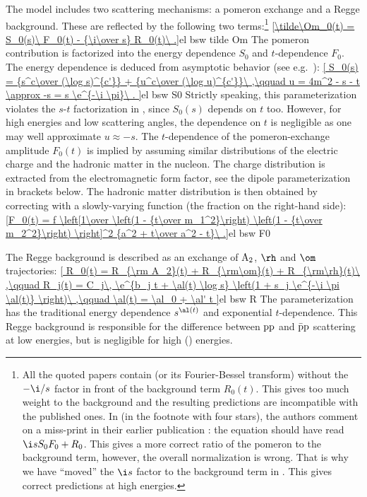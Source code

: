 The model includes two scattering mechanisms: a pomeron exchange and a Regge background. These are reflected by the following two terms:\footnote{%
All the quoted papers contain  (or its Fourier-Bessel transform) without the $-\i/s$ factor in front of the background term $R_0(t)$. This gives too much weight to the background and the resulting predictions are incompatible with the published ones. In  (in the footnote with four stars), the authors comment on a miss-print in their earlier publication : the equation should have read $\i s S_0 F_0 + R_0$. This gives a more correct ratio of the pomeron to the background term, however, the overall normalization is wrong. That is why we have ``moved'' the $\i s$ factor to the background term in . This gives correct predictions at high energies.
}
\eqref{\tilde\Om_0(t) = S_0(s)\ F_0(t) - {\i\over s} R_0(t)\ .}{el bsw tilde Om}
The pomeron contribution is factorized into the energy dependence $S_0$ and $t$-dependence $F_0$. The energy dependence is deduced from asymptotic  behavior (see e.g.~):
\eqref{
	S_0(s) = {s^c\over (\log s)^{c'}} + {u^c\over (\log u)^{c'}}\ ,\qquad
	u = 4m^2 - s - t \approx -s = s \e^{-\i \pi}\ .
}{el bsw S0}
Strictly speaking, this parameterization violates the $s$-$t$ factorization in , since $S_0(s)$ depends on $t$ too. However, for high energies and low scattering angles, the dependence on $t$ is negligible as one may well approximate $u \approx -s$. The $t$-dependence of the pomeron-exchange amplitude $F_0(t)$ is implied by assuming similar distributions of the electric charge and the hadronic matter in the nucleon. The charge distribution is extracted from the electromagnetic form factor, see the dipole parameterization in brackets below. The hadronic matter distribution is then obtained by correcting with a slowly-varying function (the fraction on the right-hand side):
\eqref{F_0(t) = f \left[1\over \left(1 - {t\over m_1^2}\right) \left(1 - {t\over m_2^2}\right) \right]^2 {a^2 + t\over a^2 - t}\ .}{el bsw F0}

The Regge background is described as an exchange of $\rm A_2$, $\rm \rh$ and $\rm \om$ trajectories:
\eqref{
	R_0(t) = R_{\rm A_2}(t) + R_{\rm\om}(t) + R_{\rm\rh}(t)\ ,\qquad
	R_j(t) = C_j\, \e^{b_j t + \al(t) \log s} \left(1 + s_j \e^{-\i \pi \al(t)} \right)\ ,\qquad
	\al(t) = \al_0 + \al' t
}{el bsw R}
The parameterization has the traditional energy dependence $s^{\al(t)}$ and exponential $t$-dependence. This Regge background is responsible for the difference between $\rm pp$ and $\rm\bar pp$ scattering at low energies, but is negligible for high () energies.

